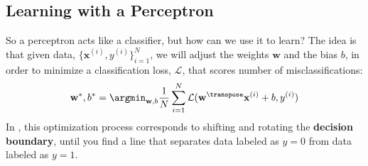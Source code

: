 \subsection{Learning with a Perceptron}
So a perceptron acts like a classifier, but how can we use it to learn? The idea is that given data, $\{\mathbf{x}^{(i)}, y^{(i)}\}_{i=1}^N$, we will adjust the weights $\mathbf{w}$ and the bias $b$, in order to minimize a classification loss, $\mathcal{L}$, that scores number of misclassifications:
\begin{align}
    \mathbf{w}^*, b^* = \argmin_{\mathbf{w}, b} \frac{1}{N}\sum_{i=1}^N \mathcal{L}(\mathbf{w}^\transpose\mathbf{x}^{(i)} + b, y^{(i)})\label{eqn:neural_nets:perceptron_learning_problem}
\end{align}
In \fig{\ref{fig:neural_nets:fitting_a_perceptron}}, this optimization process corresponds to shifting and rotating the \textbf{decision boundary}, until you find a line that separates data labeled as $y = 0$ from data labeled as $y = 1$.

